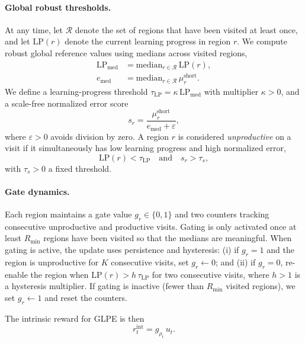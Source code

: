 \paragraph{Global robust thresholds.}
At any time, let $\mathcal{R}$ denote the set of regions that have been visited at least once, and let $\mathrm{LP}(r)$ denote the current learning progress in region $r$.
We compute robust global reference values using medians across visited regions,
\begin{equation}
\begin{aligned}
    \mathrm{LP}_{\mathrm{med}} &= \mathrm{median}_{r\in\mathcal{R}}\,\mathrm{LP}(r),\\
    e_{\mathrm{med}} &= \mathrm{median}_{r\in\mathcal{R}}\,\mu^{\mathrm{short}}_r.
\end{aligned}
\end{equation}
We define a learning-progress threshold $\tau_{\mathrm{LP}} = \kappa\,\mathrm{LP}_{\mathrm{med}}$ with multiplier $\kappa>0$, and a scale-free normalized error score
\begin{equation}
    s_r = \frac{\mu^{\mathrm{short}}_r}{e_{\mathrm{med}} + \varepsilon},
\end{equation}
where $\varepsilon>0$ avoids division by zero.
A region $r$ is considered \emph{unproductive} on a visit if it simultaneously has low learning progress and high normalized error,
\begin{equation}
    \mathrm{LP}(r) < \tau_{\mathrm{LP}} \quad\text{and}\quad s_r > \tau_s,
\end{equation}
with $\tau_s>0$ a fixed threshold.

\paragraph{Gate dynamics.}
Each region maintains a gate value $g_r\in\{0,1\}$ and two counters tracking consecutive unproductive and productive visits.
Gating is only activated once at least $R_{\min}$ regions have been visited so that the medians are meaningful.
When gating is active, the update uses persistence and hysteresis: (i) if $g_r=1$ and the region is unproductive for $K$ consecutive visits, set $g_r\leftarrow 0$; and (ii) if $g_r=0$, re-enable the region when $\mathrm{LP}(r) > h\,\tau_{\mathrm{LP}}$ for two consecutive visits, where $h>1$ is a hysteresis multiplier.
If gating is inactive (fewer than $R_{\min}$ visited regions), we set $g_r\leftarrow 1$ and reset the counters.

The intrinsic reward for GLPE is then
\begin{equation}
    r_t^{\mathrm{int}} = g_{\rho_t}\,u_t.
\end{equation}

